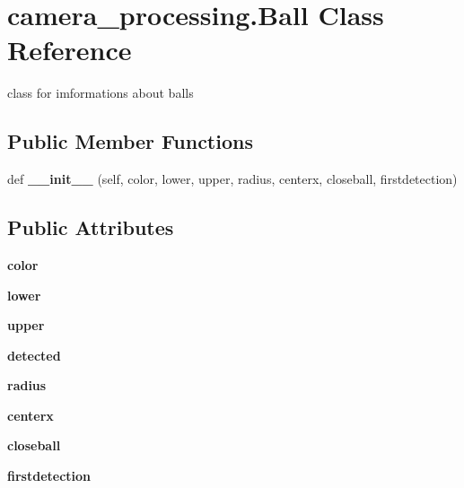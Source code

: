 \hypertarget{classcamera__processing_1_1Ball}{}\section{camera\+\_\+processing.\+Ball Class Reference}
\label{classcamera__processing_1_1Ball}


class for imformations about balls  


\subsection*{Public Member Functions}
\begin{DoxyCompactItemize}
\item 
\mbox{\label{classcamera__processing_1_1Ball_afe1bbcb95b732b87b8f33a8d39f7a1d5}} 
def {\bfseries \+\_\+\+\_\+init\+\_\+\+\_\+} (self, color, lower, upper, radius, centerx, closeball, firstdetection)
\end{DoxyCompactItemize}
\subsection*{Public Attributes}
\begin{DoxyCompactItemize}
\item 
\mbox{\label{classcamera__processing_1_1Ball_a6d7a8fbef513723d9c0069fa782fa4aa}} 
{\bfseries color}
\item 
\mbox{\label{classcamera__processing_1_1Ball_a1f02a5deead785f1a4d9b5940da8978d}} 
{\bfseries lower}
\item 
\mbox{\label{classcamera__processing_1_1Ball_a12abc5e4a2e9f6be6a6f72f5d8a968ec}} 
{\bfseries upper}
\item 
\mbox{\label{classcamera__processing_1_1Ball_a90b066175e488951bbc95a363cf36526}} 
{\bfseries detected}
\item 
\mbox{\label{classcamera__processing_1_1Ball_a1464615c2d2082097be0d228862cebd0}} 
{\bfseries radius}
\item 
\mbox{\label{classcamera__processing_1_1Ball_a4dfb4d242442048fe3499829abd246ad}} 
{\bfseries centerx}
\item 
\mbox{\label{classcamera__processing_1_1Ball_aa319ef3e0644868ca3f4dc345827f15f}} 
{\bfseries closeball}
\item 
\mbox{\label{classcamera__processing_1_1Ball_ac9673a422f961edc28b50132723bef58}} 
{\bfseries firstdetection}
\end{DoxyCompactItemize}


